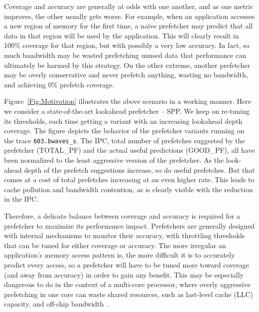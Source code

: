 Coverage and accuracy are generally at odds with one another, and as one metric improves, the other
usually gets worse. For example, when an application accesses a new region of memory for the first
time, a na\"ive prefetcher may predict that all data in that region will be used by the application.
This will clearly result in 100\% coverage for that region, but with possibly a very low accuracy.
In fact, so much bandwidth may be wasted prefetching unused data that performance can ultimately be
harmed by this strategy. On the other extreme, another prefetcher may be overly
conservative and never prefetch anything, wasting no bandwidth, and achieving 0\% prefetch
coverage.

Figure~\ref{Fig:Motivation} illustrates the above scenario in a working manner.
Here we consider a state-of-the-art lookahead prefetcher -- SPP. We keep on 
re-tuning its thresholds, each time getting a variant with an increasing lookahead 
depth coverage. The figure depicts the behavior of the prefetcher variants running 
on the trace {\tt 603.bwaves\_s}. The IPC, total number of prefetches 
suggested by the prefetcher (TOTAL\_PF) and the actual useful predictions (GOOD\_PF),
all have been normalized to the least aggressive version of the prefetcher. 
As the look-ahead depth of the prefetch suggestions increase, so do useful prefetches. 
But that comes at a cost of total prefetches increasing at an even higher rate. This leads 
to cache pollution and bandwidth contention, as is clearly visible with the reduction in 
the IPC. 

Therefore, a delicate balance between coverage and accuracy is required for a prefetcher to maximize
its performance impact. Prefetchers are generally designed with internal mechanisms to
monitor their accuracy, with throttling thresholds that can be tuned for either coverage 
or accuracy. The more irregular an application's memory access pattern is, the more difficult
it is to accurately predict every access, so a prefetcher will have to be tuned more toward
coverage (and away from accuracy) in order to gain any benefit. This may be especially dangerous
to do in the context of a multi-core processor, where overly aggressive prefetching in one core can
waste shared resources, such as last-level cache (LLC) capacity, and off-chip bandwidth~\cite{Friendly}.

